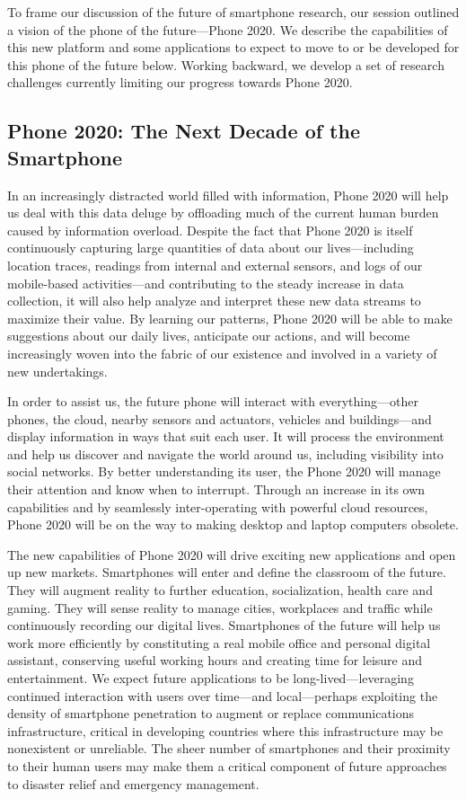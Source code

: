 To frame our discussion of the future of smartphone research, our session
outlined a vision of the phone of the future---Phone 2020. We describe the
capabilities of this new platform and some applications to expect to move to
or be developed for this phone of the future below. Working backward, we
develop a set of research challenges currently limiting our progress towards
Phone 2020.

\subsection{Phone 2020: The Next Decade of the Smartphone}

In an increasingly distracted world filled with information, Phone 2020 will
help us deal with this data deluge by offloading much of the current human
burden caused by information overload. Despite the fact that Phone 2020 is
itself continuously capturing large quantities of data about our
lives---including location traces, readings from internal and external sensors,
and logs of our mobile-based activities---and contributing to the steady
increase in data collection, it will also help analyze and interpret these
new data streams to maximize their value. By learning our patterns, Phone
2020 will be able to make suggestions about our daily lives, anticipate our
actions, and will become increasingly woven into the fabric of our existence
and involved in a variety of new undertakings.
 
In order to assist us, the future phone will interact with everything---other
phones, the cloud, nearby sensors and actuators, vehicles and buildings---and
display information in ways that suit each user. It will process the
environment and help us discover and navigate the world around us, including
visibility into social networks. By better understanding its user, the Phone
2020 will manage their attention and know when to interrupt. Through an
increase in its own capabilities and by seamlessly inter-operating with
powerful cloud resources, Phone 2020 will be on the way to making desktop and
laptop computers obsolete.
 
The new capabilities of Phone 2020 will drive exciting new applications and
open up new markets. Smartphones will enter and define the classroom of the
future. They will augment reality to further education, socialization, health
care and gaming. They will sense reality to manage cities, workplaces and
traffic while continuously recording our digital lives. Smartphones of the
future will help us work more efficiently by constituting a real mobile
office and personal digital assistant, conserving useful working hours and
creating time for leisure and entertainment. We expect future applications to
be long-lived---leveraging continued interaction with users over time---and
local---perhaps exploiting the density of smartphone penetration to augment
or replace communications infrastructure, critical in developing countries
where this infrastructure may be nonexistent or unreliable. The sheer number
of smartphones and their proximity to their human users may make them a
critical component of future approaches to disaster relief and emergency
management.
 
